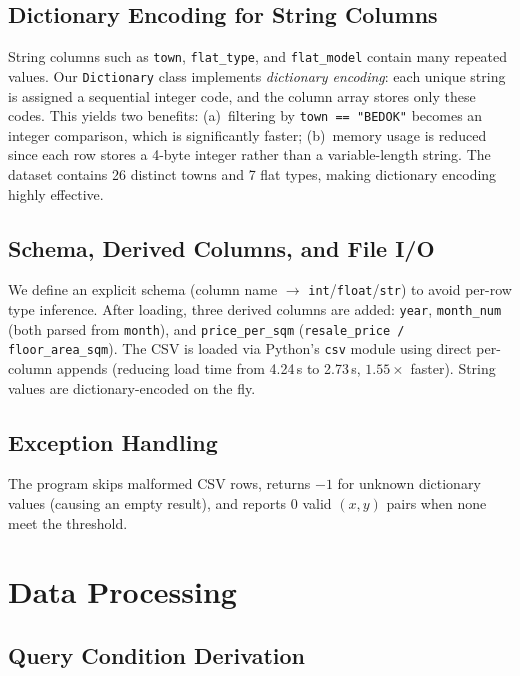 \documentclass[11pt,a4paper]{article}
\begin{document}
\subsection{Dictionary Encoding for String Columns}

String columns such as \texttt{town}, \texttt{flat\_type}, and \texttt{flat\_model} contain many repeated values. Our \texttt{Dictionary} class implements \emph{dictionary encoding}: each unique string is assigned a sequential integer code, and the column array stores only these codes. This yields two benefits: (a)~filtering by \texttt{town == "BEDOK"} becomes an integer comparison, which is significantly faster; (b)~memory usage is reduced since each row stores a 4-byte integer rather than a variable-length string. The dataset contains 26 distinct towns and 7 flat types, making dictionary encoding highly effective.

\subsection{Schema, Derived Columns, and File I/O}

We define an explicit schema (column name $\to$ \texttt{int}/\texttt{float}/\texttt{str}) to avoid per-row type inference. After loading, three derived columns are added: \texttt{year}, \texttt{month\_num} (both parsed from \texttt{month}), and \texttt{price\_per\_sqm} (\texttt{resale\_price / floor\_area\_sqm}). The CSV is loaded via Python's \texttt{csv} module using direct per-column appends (reducing load time from 4.24\,s to 2.73\,s, $1.55\times$ faster). String values are dictionary-encoded on the fly.

\subsection{Exception Handling}
The program skips malformed CSV rows, returns $-1$ for unknown dictionary values (causing an empty result), and reports 0 valid $(x, y)$ pairs when none meet the threshold.


\section{Data Processing}

\subsection{Query Condition Derivation}
\end{document}
